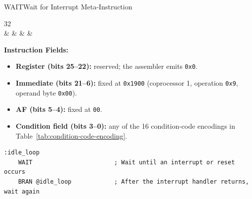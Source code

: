 \begin{instructionbox}{WAIT}{Wait for Interrupt Meta-Instruction}
	\begin{center}
		\begin{bytefield}[bitwidth=1.1em]{32}
			 \\
			 &
			 &
			 &
			 &
		\end{bytefield}
	\end{center}

	\textbf{Instruction Fields:}
	\begin{itemize}
		\item \textbf{Register (bits 25--22):} reserved; the assembler emits \texttt{0x0}.
		\item \textbf{Immediate (bits 21--6):} fixed at \texttt{0x1900} (coprocessor 1, operation \texttt{0x9},
		      operand byte \texttt{0x00}).
		\item \textbf{AF (bits 5--4):} fixed at \texttt{00}.
		\item \textbf{Condition field (bits 3--0):} any of the 16 condition-code encodings in
		      Table~\ref{tab:condition-code-encoding}.
	\end{itemize}

	\begin{example}
		\begin{lstlisting}
:idle_loop
    WAIT                       ; Wait until an interrupt or reset occurs
    BRAN @idle_loop            ; After the interrupt handler returns, wait again
		\end{lstlisting}
		\caption{Idling Until an Interrupt}
	\end{example}
\end{instructionbox}

